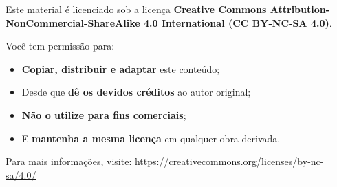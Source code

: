 \documentclass[12pt]{book}
\begin{document}
	Este material é licenciado sob a licença \textbf{Creative Commons Attribution-NonCommercial-ShareAlike 4.0 International (CC BY-NC-SA 4.0)}.
	
	\vspace{1em}
	
	Você tem permissão para:
	
	\begin{itemize}
		\item \textbf{Copiar, distribuir e adaptar} este conteúdo;
		\item Desde que \textbf{dê os devidos créditos} ao autor original;
		\item \textbf{Não o utilize para fins comerciais};
		\item E \textbf{mantenha a mesma licença} em qualquer obra derivada.
	\end{itemize}
	
	\vspace{1em}
	
	Para mais informações, visite:  
	\href{https://creativecommons.org/licenses/by-nc-sa/4.0/}{https://creativecommons.org/licenses/by-nc-sa/4.0/}
	
	\vfill
	
	\begin{center}
		\faCreativeCommons\quad
		\faCreativeCommonsBy\quad
		\faCreativeCommonsNc\quad
		\faCreativeCommonsSa
	\end{center}
	
\end{document}
